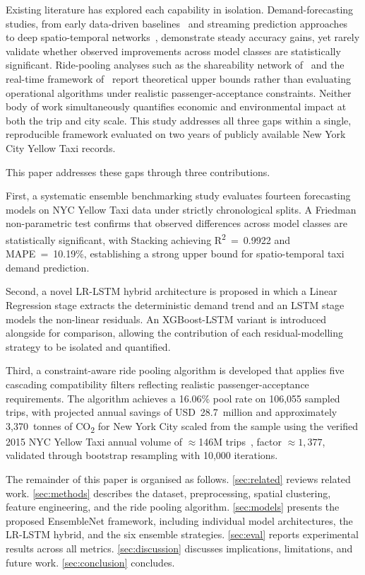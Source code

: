 \documentclass[a4paper,fleqn]{cas-dc}
\begin{document}
Existing literature has explored each capability in isolation.  Demand-forecasting studies, from early data-driven baselines~\cite{dia2002object} and streaming prediction approaches~\cite{moreira2013predicting} to deep spatio-temporal networks~\cite{zhang2017deep,xu2017realtime,kim2020hybrid}, demonstrate steady accuracy gains, yet rarely validate whether observed improvements across model classes are statistically significant.  Ride-pooling analyses such as the shareability network of~\cite{santi2014quantifying} and the real-time framework of~\cite{alonso2017demand} report theoretical upper bounds rather than evaluating operational algorithms under realistic passenger-acceptance constraints.  Neither body of work simultaneously quantifies economic and environmental impact at both the trip and city scale.  This study addresses all three gaps within a single, reproducible framework evaluated on two years of publicly available New York City Yellow Taxi records.

This paper addresses these gaps through three contributions.

First, a systematic ensemble benchmarking study evaluates fourteen forecasting models on NYC Yellow Taxi data under strictly chronological splits.  A Friedman non-parametric test confirms that observed differences across model classes are statistically significant, with Stacking achieving R\textsuperscript{2}~=~0.9922 and MAPE~=~10.19\%, establishing a strong upper bound for spatio-temporal taxi demand prediction.

Second, a novel LR-LSTM hybrid architecture is proposed in which a Linear Regression stage extracts the deterministic demand trend and an LSTM stage models the non-linear residuals.  An XGBoost-LSTM variant is introduced alongside for comparison, allowing the contribution of each residual-modelling strategy to be isolated and quantified.

Third, a constraint-aware ride pooling algorithm is developed that applies five cascading compatibility filters reflecting realistic passenger-acceptance requirements.  The algorithm achieves a 16.06\% pool rate on 106,055 sampled trips, with projected annual savings of USD~28.7~million and approximately 3{,}370~tonnes of CO\textsubscript{2} for New York City scaled from the sample using the verified 2015 NYC Yellow Taxi annual volume of $\approx$146M trips~\cite{nyc_opendata_2015}, factor $\approx 1{,}377$, validated through bootstrap resampling with 10,000 iterations.

The remainder of this paper is organised as follows.  \autoref{sec:related} reviews related work.  \autoref{sec:methods} describes the dataset, preprocessing, spatial clustering, feature engineering, and the ride pooling algorithm.  \autoref{sec:models} presents the proposed EnsembleNet framework, including individual model architectures, the LR-LSTM hybrid, and the six ensemble strategies.  \autoref{sec:eval} reports experimental results across all metrics.  \autoref{sec:discussion} discusses implications, limitations, and future work.  \autoref{sec:conclusion} concludes.
\end{document}
